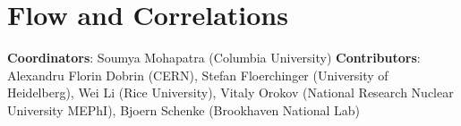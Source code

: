 \documentclass[../report.tex]{subfiles}
\providecommand{\main}{..}
\begin{document}
\section{Flow and Correlations}

\textbf{Coordinators}: Soumya Mohapatra (Columbia University)
\linebreak
\textbf{Contributors}: Alexandru Florin Dobrin (CERN), Stefan Floerchinger (University of Heidelberg), Wei Li (Rice University), Vitaly Orokov (National Research Nuclear University MEPhI), Bjoern Schenke (Brookhaven National Lab)



\clearpage
\clearpage



\clearpage
%
\clearpage
%


\clearpage
\clearpage
\clearpage
\clearpage
\end{document}
